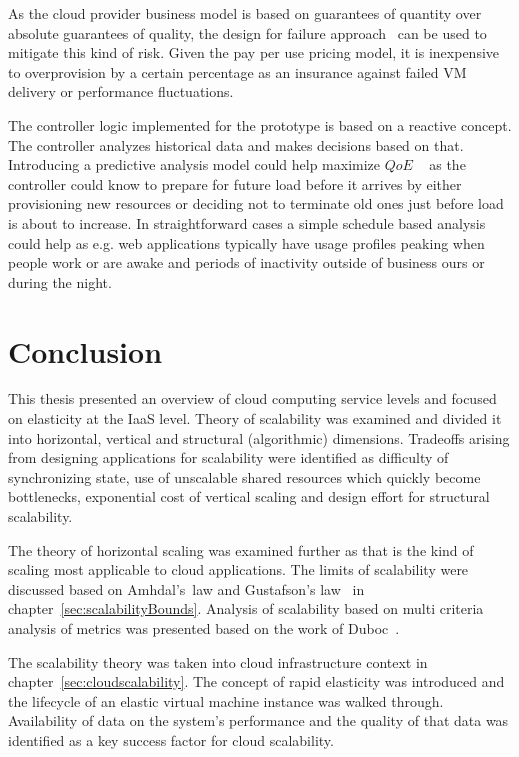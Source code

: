 \documentclass[english]{tktltiki2}
\theoremstyle{definition}
\theoremstyle{remark}
\begin{document}
As the cloud provider business model is based on guarantees of quantity over
absolute guarantees of quality, the design for failure approach~\cite{Varia2010}
can be used to mitigate this kind of risk. Given the pay per use pricing model,
it is inexpensive to overprovision by a certain percentage as an insurance
against failed VM delivery or performance fluctuations.

The controller logic implemented for the prototype is based on a reactive
concept. The controller analyzes historical data and makes decisions based on
that. Introducing a predictive analysis model could help maximize $QoE$
~\cite{cloudberkeleyviewacm} as the controller could know to prepare for future
load before it arrives by either provisioning new resources or deciding not to
terminate old ones just before load is about to increase. In straightforward cases
a simple schedule based analysis could help as e.g. web applications typically
have usage profiles peaking when people work or are awake and periods of
inactivity outside of business ours or during the night.

\section{Conclusion}
\label{sec:conclusion}

This thesis presented an overview of cloud computing service levels and focused
on elasticity at the IaaS level. Theory of scalability was examined and divided
it into horizontal, vertical and structural (algorithmic) dimensions. Tradeoffs
arising from designing applications for scalability were identified as
difficulty of synchronizing state, use of unscalable shared resources which
quickly become bottlenecks, exponential cost of vertical scaling and design
effort for structural scalability.

The theory of horizontal scaling was examined further as that is the kind of
scaling most applicable to cloud applications. The limits of scalability were
discussed based on Amhdal's~law \cite{amdahlslaw} and Gustafson's
law~\cite{gustafsonslaw} in chapter~\ref{sec:scalabilityBounds}. Analysis of
scalability based on multi criteria analysis of metrics was presented based on
the work of Duboc~\cite{Duboc2007}.

The scalability theory was taken into cloud infrastructure context in
chapter~\ref{sec:cloudscalability}. The concept of rapid elasticity was
introduced and the lifecycle of an elastic virtual machine instance was
walked through. Availability of data on the system's performance and the quality of
that data was identified as a key success factor for cloud scalability.
\end{document}
